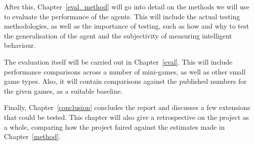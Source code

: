 After this, Chapter~\ref{eval_method} will go into detail on the methods we will use
to evaluate the performance of the agents. This will include the actual testing
methodologies, as well as the importance of testing, such as how and why
to test the generalisation of the agent and the subjectivity of measuring
intelligent behaviour.

The evaluation itself will be carried out in Chapter~\ref{eval}.
This will include performance
comparisons across a number of mini-games, as well as other small game types.
Also, it will contain comparisons against the published numbers for the given
games, as a suitable baseline.

Finally, Chapter~\ref{conclusion} concludes the report and discusses a few
extensions that could be tested. This chapter will also give a retrospective
on the project as a whole, comparing how the project faired against the estimates
made in Chapter~\ref{method}.


